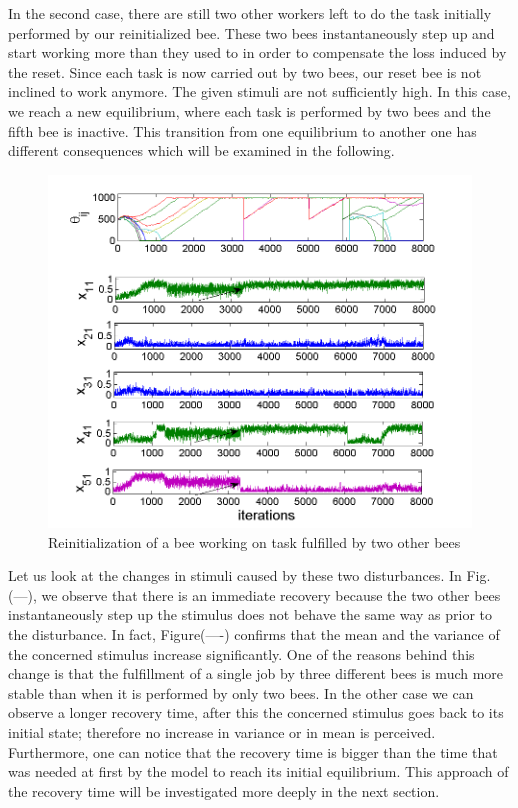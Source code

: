 In the second case, there are still two other workers left to do the task initially performed by our reinitialized bee. These two bees instantaneously step up and start working more than they used to in order to compensate the loss induced by the reset. Since each task is now carried out by two bees, our reset bee is not inclined to work anymore. The given stimuli are not sufficiently high. In this case, we reach a new equilibrium, where each task is performed by two bees and the fifth bee is inactive. This transition from one equilibrium to another one has different consequences which will be examined in the following.

\begin{center}
\begin{figure}
\centering{}\includegraphics[scale=0.5]{figures/Figure2}\caption{Reinitialization of a bee working on task fulfilled by two other bees}
\label{fig:figure2}
\end{figure}

\par\end{center}

Let us look at the changes in stimuli caused by these two disturbances. In Fig. (---), we observe that there is an immediate recovery because the two other bees instantaneously step up the stimulus does not behave the same way as prior to the disturbance.
In fact, Figure(----) confirms that the mean and the variance of the concerned stimulus increase significantly. One of the reasons behind this change is that the fulfillment of a single job by three different bees is much more stable than when it is performed by only two bees. In the other case we can observe a longer recovery time, after this the concerned stimulus goes back to its initial state; therefore no increase in variance or in mean is perceived. Furthermore, one can notice that the recovery time is bigger than the time that was needed at first by the model to reach its initial equilibrium. This approach of the recovery time will be investigated more deeply in the next section.

